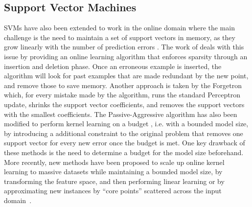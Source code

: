 \subsection*{Support Vector Machines}
SVMs have also
been extended to work in the online domain \cite{online-kernels}
where the main challenge is the need to maintain a set of support vectors
in memory, as they grow linearly with the number of prediction errors
\cite{budget-classification}. The work of \citet{budget-classification}
deals with this issue by providing an online learning algorithm
that enforces sparsity through an insertion and deletion phase.
Once an erroneous example is inserted, the algorithm will look
for past examples that are made redundant by the new point,
and remove those to save memory.
Another approach is taken by the Forgetron \cite{forgetron} which,
for every mistake made by the algorithm, runs the standard
Perceptron update, shrinks the support vector coefficients, and removes
the support vectors with the smallest coefficients.
The Passive-Aggressive algorithm has also been modified
to perform kernel learning on a budget \cite{pa-budget},
i.e. with a bounded model size, by introducing a additional
constraint to the original problem that removes one support
vector for every new error once the budget is met.
One key drawback of these methods
is the need to determine a budget for the model size beforehand.
More recently, new methods have been proposed to scale up
online kernel learning to massive datasets while maintaining a bounded model size,
by transforming the feature space, and then performing linear learning \citet{large-online-kernels}
or by approximating new instances by ``core points''
scattered across the input domain~\citet{approximation-vm}.

